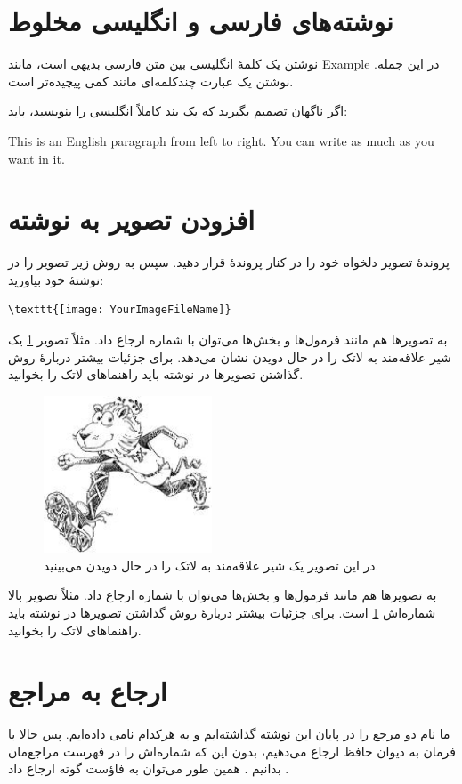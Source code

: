 \documentclass{article}
\begin{document}
\section{نوشته‌های فارسی و انگلیسی مخلوط}
نوشتن یک کلمهٔ انگلیسی بین متن فارسی بدیهی است، مانند Example در این جمله.
نوشتن یک عبارت چندکلمه‌ای مانند
  کمی پیچیده‌تر است.

اگر ناگهان تصمیم بگیرید که یک بند کاملاً انگلیسی را بنویسید، باید:
\begin{latin}
This is an English paragraph from left to right. You can write as much as you want in it.
\end{latin}
\section{افزودن تصویر به نوشته}
پروندهٔ تصویر دلخواه خود را در کنار پروندهٔ  قرار دهید. سپس به روش زیر تصویر را در نوشتهٔ خود بیاورید:
\begin{latin}
\begin{verbatim}
\texttt{[image: YourImageFileName]}
\end{verbatim}
\end{latin}
به تصویرها هم مانند فرمول‌ها و بخش‌ها می‌توان با شماره ارجاع داد. مثلاً تصویر  \ref{shir} یک شیر علاقه‌مند به لاتک را در حال دویدن نشان می‌دهد. برای جزئیات بیشتر دربارهٔ روش گذاشتن تصویرها در نوشته باید راهنماهای لاتک را بخوانید.
\begin{figure}%
\centerline{\includegraphics[width=5cm]{lion}}
\caption{\label{shir}\small در این تصویر یک شیر علاقه‌مند به لاتک را در حال دویدن می‌بینید.}
\end{figure}

به تصویرها هم مانند فرمول‌ها و بخش‌ها می‌توان با شماره ارجاع داد. مثلاً تصویر بالا شماره‌اش \ref{shir} است. برای جزئیات بیشتر دربارهٔ روش گذاشتن تصویرها در نوشته باید راهنماهای لاتک را بخوانید.
\section{ارجاع به مراجع}
ما نام دو مرجع را در پایان این نوشته گذاشته‌ایم و به هرکدام نامی داده‌ایم. پس حالا با فرمان  به دیوان حافظ ارجاع می‌دهیم، بدون این که شماره‌اش را در فهرست مراجع‌مان بدانیم \cite{حافظ}. همین طور می‌توان به فاؤست گوته ارجاع داد \cite{faust}.
\end{document}
